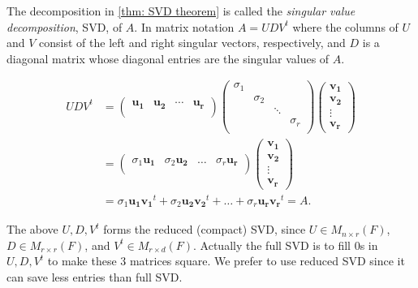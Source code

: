 \begin{definition}
  The decomposition in \autoref{thm: SVD theorem} is called the \textit{singular value decomposition}, SVD, of \(A\). In matrix notation \(A=UDV^t\) where the columns of \(U\) and \(V\) consist of the left and right singular vectors, respectively, and \(D\) is a diagonal matrix whose diagonal entries are the singular values of \(A\).      
\end{definition}
\begin{align*}
  UDV^t &=
  \begin{pmatrix}
    \mathbf{u_1}  & \mathbf{u_2}  & \cdots  &\mathbf{u_r}\\
  \end{pmatrix}
  \begin{pmatrix}
    \sigma _1 &  &  &  \\
     &  \sigma _2&   &  \\
     &  &  \ddots&  \\
     &  &  & \sigma _r \\
  \end{pmatrix}
  \begin{pmatrix}
     \mathbf{v_1}  \\
      \mathbf{v_2} \\
      \vdots\\
      \mathbf{v_r}
  \end{pmatrix} \\
  &= \begin{pmatrix}
    \sigma _1 \mathbf{u_1}  &\sigma _2 \mathbf{u_2}  &\dots   &\sigma _r \mathbf{u_{r} }   \\
  \end{pmatrix}
 \begin{pmatrix}
     \mathbf{v_1}  \\
      \mathbf{v_2} \\
      \vdots\\
      \mathbf{v_r}
  \end{pmatrix} \\
  &= \sigma _1 \mathbf{u_1}\mathbf{v_1}^t + \sigma _2 \mathbf{u_2}\mathbf{v_2}^t + \dots + \sigma _r \mathbf{u_{r} }\mathbf{v_r}^t = A.
\end{align*}

\begin{note}
  The above \(U, D, V^t\) forms the reduced (compact) SVD, since \(U \in M_{n \times r}(F)\), \(D \in M_{r \times r}(F)\), and \(V^t \in M_{r \times d}(F)\). Actually the full SVD is to fill \(0\)s in \(U, D, V^t\) to make these \(3\) matrices square. We prefer to use reduced SVD since it can save less entries than full SVD.   
\end{note}

